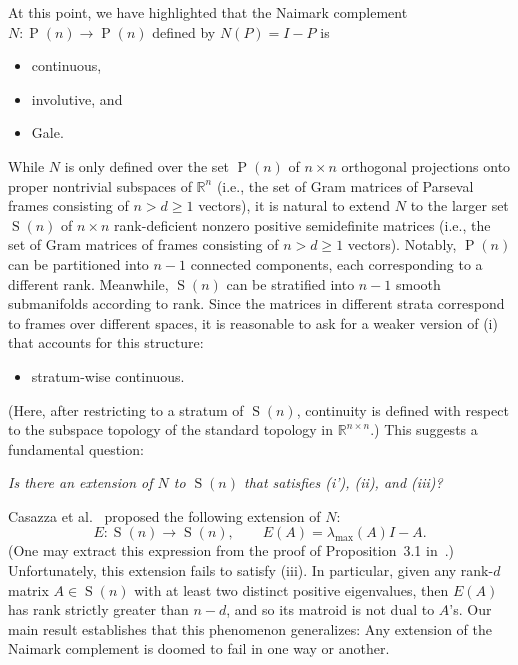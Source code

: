\documentclass[12pt]{article}
\theoremstyle{plain}
\theoremstyle{definition}
\theoremstyle{remark}
\newcommand{\oP}{\operatorname{P}}
\newcommand{\oS}{\operatorname{S}}
\newcommand{\bR}{\mathbb{R}}
\begin{document}
At this point, we have highlighted that the Naimark complement $N\colon\oP(n)\to\oP(n)$ defined by $N(P)=I-P$ is
\begin{itemize}
\item[(i)]
continuous,
\item[(ii)]
involutive, and
\item[(iii)]
Gale.
\end{itemize}
While $N$ is only defined over the set $\oP(n)$ of $n\times n$ orthogonal projections onto proper nontrivial subspaces of $\mathbb{R}^n$ (i.e., the set of Gram matrices of Parseval frames consisting of $n>d\geq1$ vectors), it is natural to extend $N$ to the larger set $\oS(n)$ of $n\times n$ rank-deficient nonzero positive semidefinite matrices (i.e., the set of Gram matrices of frames consisting of $n>d\geq1$ vectors).
Notably, $\oP(n)$ can be partitioned into $n-1$ connected components, each corresponding to a different rank.
Meanwhile, $\oS(n)$ can be stratified into $n-1$ smooth submanifolds according to rank.
Since the matrices in different strata correspond to frames over different spaces, it is reasonable to ask for a weaker version of (i) that accounts for this structure:
\begin{itemize}
\item[(i')]
stratum-wise continuous.
\end{itemize}
(Here, after restricting to a stratum of $\oS(n)$, continuity is defined with respect to the subspace topology of the standard topology in $\bR^{n\times n}$.)
This suggests a fundamental question:

\begin{center}
\textit{Is there an extension of $N$ to $\oS(n)$ that satisfies (i'), (ii), and (iii)?}
\end{center}

Casazza et al.~\cite{CasazzaFMPS:13} proposed the following extension of $N$:
\begin{equation}
\label{eq.casazza}
E\colon\oS(n)\to\oS(n),
\qquad
E(A)=\lambda_{\max}(A)I-A.
\end{equation}
(One may extract this expression from the proof of Proposition~3.1 in~\cite{CasazzaFMPS:13}.)
Unfortunately, this extension fails to satisfy (iii).
In particular, given any rank-$d$ matrix $A\in\oS(n)$ with at least two distinct positive eigenvalues, then $E(A)$ has rank strictly greater than $n-d$, and so its matroid is not dual to $A$'s.
Our main result establishes that this phenomenon generalizes:
Any extension of the Naimark complement is doomed to fail in one way or another.
\end{document}
